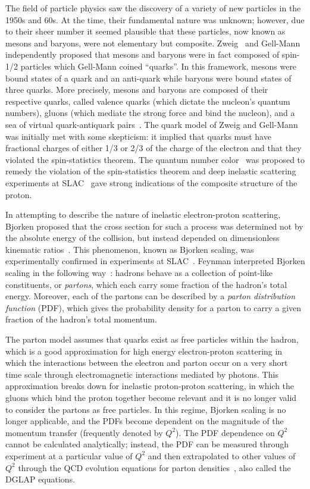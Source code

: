 The field of particle physics saw the discovery of a variety of new particles in the 1950s and 60s.
At the time, their fundamental nature was unknown; however, due to their sheer number it seemed plausible that these particles, now known as mesons and baryons, were not elementary but composite.
Zweig~\cite{Zweig:1964jf} and Gell-Mann~\cite{GellMann:1964nj} independently proposed that mesons and baryons were in fact composed of spin-1/2 particles which Gell-Mann coined ``quarks''.
In this framework, mesons were bound states of a quark and an anti-quark while baryons were bound states of three quarks. More precisely, mesons and baryons are composed of their respective quarks, called valence quarks (which dictate the nucleon's quantum numbers), gluons (which mediate the strong force and bind the nucleon), and a sea of virtual quark-antiquark pairs~\cite{Yan:2015zoa}. 
The quark model of Zweig and Gell-Mann was initially met with some skepticism: it implied that quarks must have fractional charges of either 1/3 or 2/3 of the charge of the electron and that they violated the spin-statistics theorem.
The quantum number color~\cite{Greenberg:1964pe} was proposed to remedy the violation of the spin-statistics theorem and deep inelastic scattering experiments at SLAC~\cite{Breidenbach:1969kd,Bloom:1969kc} gave strong indications of the composite structure of the proton.

In attempting to describe the nature of inelastic electron-proton scattering, Bjorken proposed that the cross section for such a process was determined not by the absolute energy of the collision, but instead depended on dimensionless kinematic ratios~\cite{Bjorken:1969ja}.
This phenomenon, known as Bjorken scaling, was experimentally confirmed in experiments at SLAC~\cite{Prentki:1968fha}. 
Feynman interpreted Bjorken scaling in the following way~\cite{Feynman:1969ej}: hadrons behave as a collection of point-like constituents, or \emph{partons}, which each carry some fraction of the hadron's total energy.
Moreover, each of the partons can be described by a \emph{parton distribution function} (PDF), which gives the probability density for a parton to carry a given fraction of the hadron's total momentum.

The parton model assumes that quarks exist as free particles within the hadron, which is a good approximation for high energy electron-proton scattering in which the interactions between the electron and parton occur on a very short time scale through electromagnetic interactions mediated by photons.
This approximation breaks down for inelastic proton-proton scattering, in which the gluons which bind the proton together become relevant and it is no longer valid to consider the partons as free particles.
In this regime, Bjorken scaling is no longer applicable, and the PDFs become dependent on the magnitude of the momentum transfer (frequently denoted by $Q^2$).
The PDF dependence on $Q^2$ cannot be calculated analytically; instead, the PDF can be measured through experiment at a particular value of $Q^2$ and then extrapolated to other values of $Q^2$ through the QCD evolution equations for parton densities~\cite{Altarelli:1977zs,Dokshitzer:1977sg,Gribov:1972ri}, also called the DGLAP equations.

